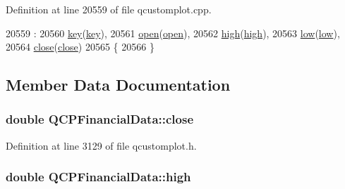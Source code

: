 Definition at line 20559 of file qcustomplot.\+cpp.


\begin{DoxyCode}
20559                                                                                                  :
20560   \hyperlink{class_q_c_p_financial_data_a18bc92126f28c214b05b0161e5f5958b}{key}(\hyperlink{class_q_c_p_financial_data_a18bc92126f28c214b05b0161e5f5958b}{key}),
20561   \hyperlink{class_q_c_p_financial_data_a3059e1e1fbcb9fd243fde0450f238032}{open}(\hyperlink{class_q_c_p_financial_data_a3059e1e1fbcb9fd243fde0450f238032}{open}),
20562   \hyperlink{class_q_c_p_financial_data_a299a4b241296fb6cd1baf5ab03f7126a}{high}(\hyperlink{class_q_c_p_financial_data_a299a4b241296fb6cd1baf5ab03f7126a}{high}),
20563   \hyperlink{class_q_c_p_financial_data_aecce0fb45a115e3f3a25eea78491ac16}{low}(\hyperlink{class_q_c_p_financial_data_aecce0fb45a115e3f3a25eea78491ac16}{low}),
20564   \hyperlink{class_q_c_p_financial_data_a45e9b96944c4a08ea6c82a72d3d22df2}{close}(\hyperlink{class_q_c_p_financial_data_a45e9b96944c4a08ea6c82a72d3d22df2}{close})
20565 \{
20566 \}
\end{DoxyCode}


\subsection{Member Data Documentation}
\hypertarget{class_q_c_p_financial_data_a45e9b96944c4a08ea6c82a72d3d22df2}{}
\subsubsection[{close}]{\setlength{\rightskip}{0pt plus 5cm}double Q\+C\+P\+Financial\+Data\+::close}\label{class_q_c_p_financial_data_a45e9b96944c4a08ea6c82a72d3d22df2}


Definition at line 3129 of file qcustomplot.\+h.

\hypertarget{class_q_c_p_financial_data_a299a4b241296fb6cd1baf5ab03f7126a}{}
\subsubsection[{high}]{\setlength{\rightskip}{0pt plus 5cm}double Q\+C\+P\+Financial\+Data\+::high}\label{class_q_c_p_financial_data_a299a4b241296fb6cd1baf5ab03f7126a}


